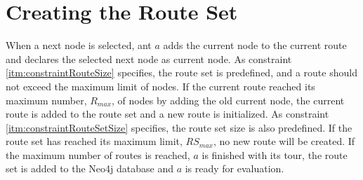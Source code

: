 \section{Creating the Route Set}

When a next node is selected, ant $a$ adds the current node to the current route and declares the selected next node as current node. As constraint \vref{itm:constraintRouteSize} specifies, the route set is predefined, and a route should not exceed the maximum limit of nodes. If the current route reached its maximum number, $R_{max}$, of nodes by adding the old current node, the current route is added to the route set and a new route is initialized. As constraint \vref{itm:constraintRouteSetSize} specifies, the route set size is also predefined. If the route set has reached its maximum limit, $RS_{max}$, no new route will be created. If the maximum number of routes is reached, $a$ is finished with its tour, the route set is added to the Neo4j database and $a$ is ready for evaluation. 
